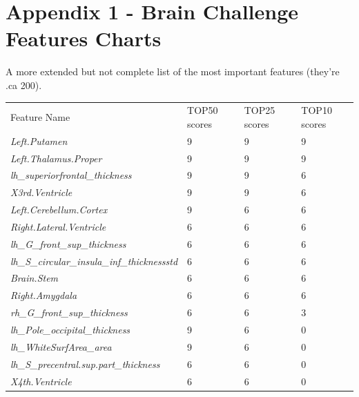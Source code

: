 \documentclass{article}
\begin{document}
\section*{Appendix 1 - Brain Challenge Features Charts} \label{sec:app1}
A more extended but not complete list of the most important features (they're .ca 200).
\begin{table}[ht]
\begin{tabular}{llll}
Feature Name                                        & TOP50 scores & TOP25 scores & TOP10 scores    \\
\textit{Left.Putamen}                               & 9             & 9             & 9             \\
\textit{Left.Thalamus.Proper}                       & 9             & 9             & 9             \\
\textit{lh\_superiorfrontal\_thickness}             & 9             & 9             & 6             \\
\textit{X3rd.Ventricle}                             & 9             & 9             & 6             \\
\textit{Left.Cerebellum.Cortex}                     & 9             & 6             & 6             \\
\textit{Right.Lateral.Ventricle}                    & 6             & 6             & 6             \\
\textit{lh\_G\_front\_sup\_thickness}               & 6             & 6             & 6             \\
\textit{lh\_S\_circular\_insula\_inf\_thicknessstd} & 6             & 6             & 6             \\
\textit{Brain.Stem}                                 & 6             & 6             & 6             \\
\textit{Right.Amygdala}                             & 6             & 6             & 6             \\
\textit{rh\_G\_front\_sup\_thickness}               & 6             & 6             & 3             \\
\textit{lh\_Pole\_occipital\_thickness}             & 9             & 6             & 0             \\
\textit{lh\_WhiteSurfArea\_area}                    & 9             & 6             & 0             \\
\textit{lh\_S\_precentral.sup.part\_thickness}      & 6             & 6             & 0             \\
\textit{X4th.Ventricle}                             & 6             & 6             & 0             \\

\end{tabular}
\end{table}
\end{document}

